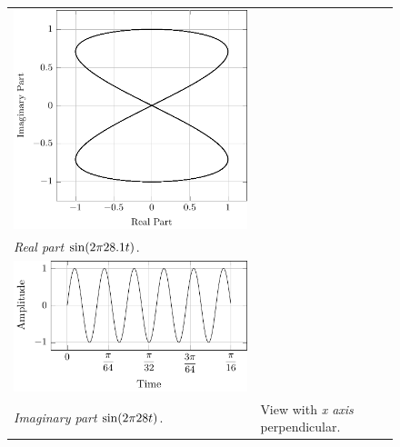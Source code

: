 \documentclass[../../course]{subfiles}
\begin{document}
\begin{figure} [H]
\begin{NiceTabularX} {\textwidth} {
            *{2}{>{\centering\arraybackslash}X}
        }
         {
             {
                \includegraphics[height = \textheight] {tikzpics/plotFrontViewComplexD.pdf}
            }
        }

        \\

         {\emph{Real part} $\sin(2 \pi 28.1 t)$.}
        \label{plt:realCmplxD}

        &
        \\

         {
             {
                \includegraphics[height = \textheight] {tikzpics/plotShortX1.pdf}
            }
        }

        &
        \\

         {\emph{Imaginary part} $\sin(2 \pi 28 t)$.}
        \label{plt:imagCmplxD}

        &

         {View with \emph{x axis} perpendicular.}
        \label{plt:frontViewCmplxD}

        \\

    \end{NiceTabularX}

\end{figure}
\end{document}
